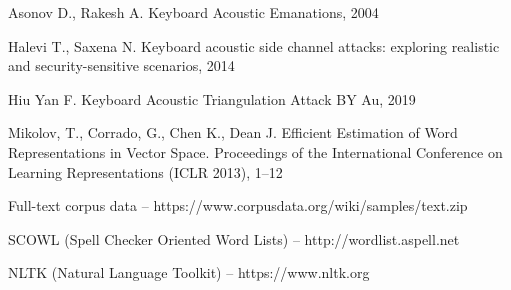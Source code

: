 \begin{thebibliography}{17}
     Asonov D., Rakesh A. Keyboard Acoustic Emanations, 2004

     Halevi T., Saxena N. Keyboard acoustic side channel attacks: exploring realistic and security-sensitive scenarios, 2014

     Hiu Yan F. Keyboard Acoustic Triangulation Attack BY Au, 2019

     Mikolov, T., Corrado, G., Chen K., Dean J. Efficient Estimation of Word Representations in Vector Space. Proceedings of the International Conference on Learning Representations (ICLR 2013), 1–12

      Full-text corpus data -- https://www.corpusdata.org/wiki/samples/text.zip
   
     SCOWL (Spell Checker Oriented Word Lists) -- http://wordlist.aspell.net
   
     NLTK (Natural Language Toolkit) -- https://www.nltk.org
    
\end{thebibliography}
